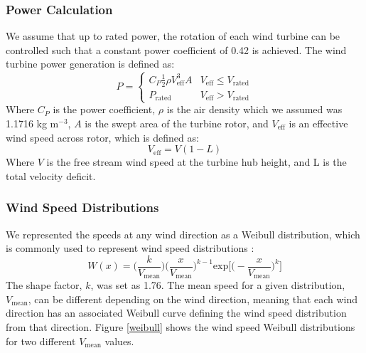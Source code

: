 \subsubsection{Power Calculation}
We assume that up to rated power, the rotation of each wind turbine can be controlled such that a constant power coefficient of 0.42 is achieved. The wind turbine power generation is defined as:
\begin{equation}
P = 
\begin{cases} 
      C_P\frac{1}{2}\rho V_{\text{eff}}^3A & V_{\text{eff}}\leq V_{\text{rated}} \\
      P_{\text{rated}} & V_{\text{eff}} > V_{\text{rated}}
   \end{cases}
\end{equation}
\noindent Where $C_P$ is the power coefficient, $\rho$ is the air density which we assumed was 1.1716 kg m$^{-3}$, $A$ is the swept area of the turbine rotor, and $V_{\text{eff}}$ is an effective wind speed across rotor, which is defined as:
\begin{equation}
V_{\text{eff}} = V(1-L)
\end{equation}
\noindent Where $V$ is the free stream wind speed at the turbine hub height, and L is the total velocity deficit.


\subsubsection{Wind Speed Distributions}

We represented the speeds at any wind direction as a Weibull distribution, which is commonly used to represent wind speed distributions \citep{justus1978methods,rehman1994weibull,dorvlo2002estimating}: 
\begin{equation}
W(x) = \Big(\frac{k}{V_{\text{mean}}}\Big)\Big(\frac{x}{V_{\text{mean}}}\Big)^{k-1}\text{exp}\Big[\Big(-\frac{x}{V_{\text{mean}}}\Big)^k\Big]
\end{equation}
The shape factor, $k$, was set as 1.76. 
The mean speed for a given distribution, $V_{\text{mean}}$, can be different depending on the wind direction, meaning that each wind direction has an associated Weibull curve defining the wind speed distribution from that direction. 
Figure \ref{weibull} shows the wind speed Weibull distributions for two different $V_{\text{mean}}$ values. 



